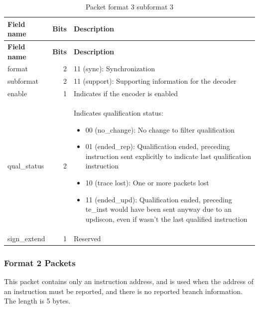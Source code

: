 \documentclass[main\_\_EN.tex]{subfiles}
\begin{document}
\begin{longtable}[c]{ |l|r|L{10cm}| }
    \caption{Packet format 3 subformat 3}
    \label{tab:f3s3}
    \\\hline{}
    \textbf{Field name} & \textbf{Bits} & \textbf{Description} \\\hline
    \endfirsthead
    \textbf{Field name} & \textbf{Bits} & \textbf{Description} \\\hline
    \endhead
    \endfoot
    \endlastfoot

    format & 2 & 11 (sync): Synchronization \\\hline
    subformat & 2 & 11 (support): Supporting information for the decoder \\\hline
    enable & 1 & Indicates if the encoder is enabled \\\hline
    qual\_status & 2 & Indicates qualification status:
    \begin{itemize}
        \item 00 (no\_change): No change to filter qualification
        \item 01 (ended\_rep): Qualification ended, preceding instruction sent explicitly to indicate last qualification instruction
        \item 10 (trace lost): One or more packets lost
        \item 11 (ended\_upd): Qualification ended, preceding te\_inst would have been sent anyway due to an updiscon, even if wasn't the last qualified instruction
        \vspace{-1.5em}
    \end{itemize}
    \\\hline
    sign\_extend & 1 & Reserved \\\hline

 \end{longtable}




\subsubsection{Format 2 Packets}

This packet contains only an instruction address, and is used when the address of an instruction must be reported, and there is no reported branch information. The length is 5 bytes.
\end{document}
